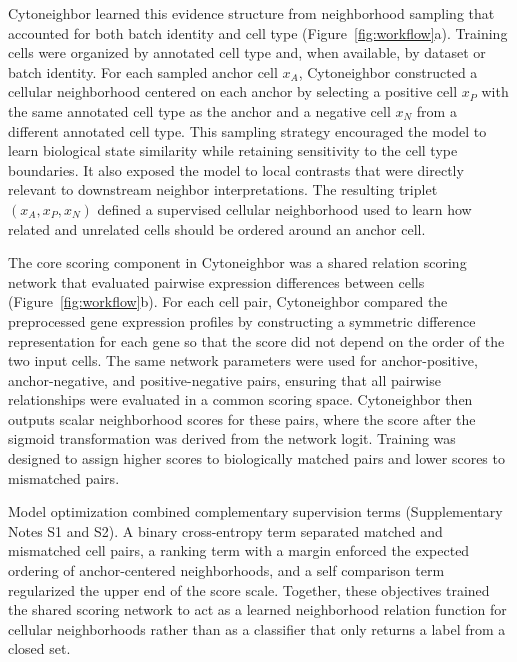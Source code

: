 \documentclass[11pt]{article}
\begin{document}
Cytoneighbor learned this evidence structure from neighborhood sampling that accounted for both batch identity and cell type (Figure~\ref{fig:workflow}a). Training cells were organized by annotated cell type and, when available, by dataset or batch identity. For each sampled anchor cell $x_A$, Cytoneighbor constructed a cellular neighborhood centered on each anchor by selecting a positive cell $x_P$ with the same annotated cell type as the anchor and a negative cell $x_N$ from a different annotated cell type. This sampling strategy encouraged the model to learn biological state similarity while retaining sensitivity to the cell type boundaries. It also exposed the model to local contrasts that were directly relevant to downstream neighbor interpretations. The resulting triplet $(x_A, x_P, x_N)$ defined a supervised cellular neighborhood used to learn how related and unrelated cells should be ordered around an anchor cell.

The core scoring component in Cytoneighbor was a shared relation scoring network that evaluated pairwise expression differences between cells (Figure~\ref{fig:workflow}b). For each cell pair, Cytoneighbor compared the preprocessed gene expression profiles by constructing a symmetric difference representation for each gene so that the score did not depend on the order of the two input cells. The same network parameters were used for anchor-positive, anchor-negative, and positive-negative pairs, ensuring that all pairwise relationships were evaluated in a common scoring space. Cytoneighbor then outputs scalar neighborhood scores for these pairs, where the score after the sigmoid transformation was derived from the network logit. Training was designed to assign higher scores to biologically matched pairs and lower scores to mismatched pairs.

Model optimization combined complementary supervision terms (Supplementary Notes S1 and S2). A binary cross-entropy term separated matched and mismatched cell pairs, a ranking term with a margin enforced the expected ordering of anchor-centered neighborhoods, and a self comparison term regularized the upper end of the score scale. Together, these objectives trained the shared scoring network to act as a learned neighborhood relation function for cellular neighborhoods rather than as a classifier that only returns a label from a closed set.
\end{document}
